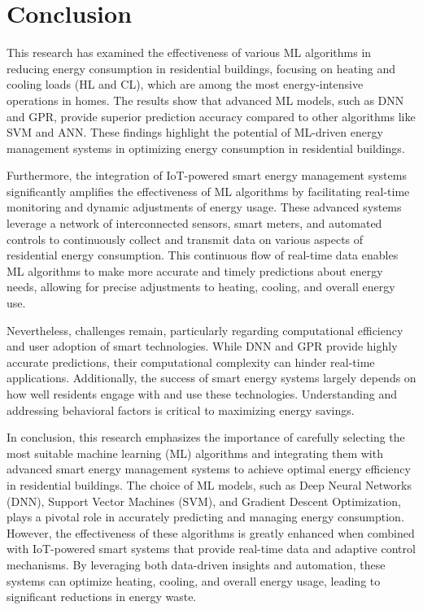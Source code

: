 \documentclass[a4paper, 12pt]{article}
\begin{document}
\section{Conclusion}
\quad This research has examined the effectiveness of various ML algorithms in reducing energy consumption in residential buildings, focusing on heating and cooling loads (HL and CL), which are among the most energy-intensive operations in homes. The results show that advanced ML models, such as DNN and GPR, provide superior prediction accuracy compared to other algorithms like SVM and ANN. These findings highlight the potential of ML-driven energy management systems in optimizing energy consumption in residential buildings.
\vspace{7pt}

\quad Furthermore, the integration of IoT-powered smart energy management systems significantly amplifies the effectiveness of ML algorithms by facilitating real-time monitoring and dynamic adjustments of energy usage. These advanced systems leverage a network of interconnected sensors, smart meters, and automated controls to continuously collect and transmit data on various aspects of residential energy consumption. This continuous flow of real-time data enables ML algorithms to make more accurate and timely predictions about energy needs, allowing for precise adjustments to heating, cooling, and overall energy use.
\vspace{7pt}

\quad Nevertheless, challenges remain, particularly regarding computational efficiency and user adoption of smart technologies. While DNN and GPR provide highly accurate predictions, their computational complexity can hinder real-time applications. Additionally, the success of smart energy systems largely depends on how well residents engage with and use these technologies. Understanding and addressing behavioral factors is critical to maximizing energy savings.
\vspace{7pt}

\quad In conclusion, this research emphasizes the importance of carefully selecting the most suitable machine learning (ML) algorithms and integrating them with advanced smart energy management systems to achieve optimal energy efficiency in residential buildings. The choice of ML models, such as Deep Neural Networks (DNN), Support Vector Machines (SVM), and Gradient Descent Optimization, plays a pivotal role in accurately predicting and managing energy consumption. However, the effectiveness of these algorithms is greatly enhanced when combined with IoT-powered smart systems that provide real-time data and adaptive control mechanisms. By leveraging both data-driven insights and automation, these systems can optimize heating, cooling, and overall energy usage, leading to significant reductions in energy waste.
\end{document}
